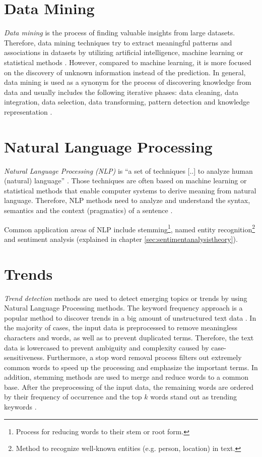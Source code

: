 \section{Data Mining}
\label{sec:data-mining}
\textit{Data mining} is the process of finding valuable insights from large datasets. Therefore, data mining techniques try to extract meaningful patterns and associations in datasets by utilizing artificial intelligence, machine learning or statistical methods \cite{han2012mining}. However, compared to machine learning, it is more focused on the discovery of unknown information instead of the prediction. In general, data mining is used as a synonym for the process of discovering knowledge from data and usually includes the following iterative phases: data cleaning, data integration, data selection, data transforming, pattern detection and knowledge representation \cite[6\psqq]{han2012mining}.

\section{Natural Language Processing}
\label{sec:nlp}
\textit{Natural Language Processing (NLP)} is \enquote{a set of techniques [..] to analyze human (natural) language} \cite[29]{McKinsey2011}. Those techniques are often based on machine learning or statistical methods that enable computer systems to derive meaning from natural language. Therefore, NLP methods need to analyze and understand the syntax, semantics and the context (pragmatics) of a sentence \cite{Linckels:2011:ESU:1995306}.

Common application areas of NLP include stemming\footnote{Process for reducing words to their stem or root form.}, named entity  recognition\footnote{Method to recognize well-known entities (e.g. person, location) in text.} and sentiment analysis (explained in chapter \ref{sec:sentimentanalysistheory}).

\section{Trends}
\label{sec:trends}
\textit{Trend detection} methods are used to detect emerging topics or trends by using Natural Language Processing methods. The keyword frequency approach is a popular method to discover trends in a big amount of unstructured text data \cite{journals/smarthome/Kim+13}. In the majority of cases, the input data is preprocessed to remove meaningless characters and words, as well as to prevent duplicated terms. Therefore, the text data is lowercased to prevent ambiguity and complexity caused by case-sensitiveness. Furthermore, a stop word removal process filters out extremely common words to speed up the processing and emphasize the important terms. In addition, stemming methods are used to merge and reduce words to a common base. After the preprocessing of the input data, the remaining words are ordered by their frequency of occurrence and the top $k$ words stand out as trending keywords \cite[213\psq]{journals/smarthome/Kim+13}.

